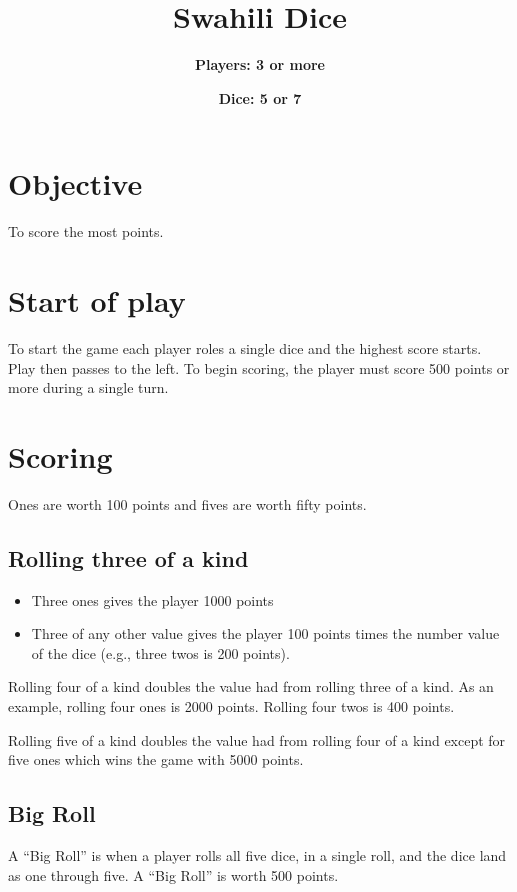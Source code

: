 \documentclass[twocolumn,12pt]{article}
\begin{document}
\parindent=0in

\title{\bf{Swahili Dice}}
\author{\bf{Players:} 3 or more}
\date{\bf{Dice:} 5 or 7}
\maketitle

\thispagestyle{empty}

\section*{Objective}
To score the most points.

\section*{Start of play}
To start the game each player roles a single dice and the highest score
starts. Play then passes to the left.  To begin scoring, the player must score
500 points or more during a single turn.

\section*{Scoring}
Ones are worth 100 points and fives are worth fifty points.
\subsection*{Rolling three of a kind}
\begin{itemize}
\item Three ones gives the player 1000 points
\item Three of any other value gives the player 100 points times the number
  value of the dice (e.g., three twos is 200 points).
\end{itemize}

Rolling four of a kind doubles the value had from rolling three of a kind.  As
an example, rolling four ones is 2000 points.  Rolling four twos is 400
points.

Rolling five of a kind doubles the value had from rolling four of a kind
except for five ones which wins the game with 5000 points.

\subsection*{Big Roll}
A ``Big Roll'' is when a player rolls all five dice, in a single roll, and the dice
land as one through five. A ``Big Roll'' is worth 500 points.
\end{document}
